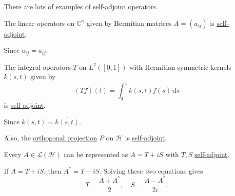 There are lots of examples of \hyperref[def:self-adjoint-op]{self-adjoint operators}.

\begin{eg}
	The linear operators on \(\mathbb{C} ^n\) given by Hermitian matrices \(A = (a_{ij} )\) is \hyperref[def:self-adjoint-op]{self-adjoint}.
\end{eg}
\begin{explanation}
	Since \(a_{ij} = \overline{a_{ij}}\).
\end{explanation}

\begin{eg}
	The integral operators \(T\) on \(L^2([0, 1])\) with Hermitian symmetric kernels \(k(s, t)\) given by
	\[
		(Tf)(t) = \int_{0}^{1} k(s, t)f(s) \,\mathrm{d}s
	\]
	is \hyperref[def:self-adjoint-op]{self-adjoint}.
\end{eg}
\begin{explanation}
	Since \(k(s, t) = \overline{k(s, t)}\).
\end{explanation}

Also, the \hyperref[def:orthogonal-projection]{orthogonal projection} \(P\) on \(\mathcal{H} \) is \hyperref[def:self-adjoint-op]{self-adjoint}.

\begin{remark}
	Every \(A\in \mathcal{L} (\mathcal{H} )\) can be represented as \(A = T+iS\) with \(T, S\) \hyperref[def:self-adjoint-op]{self-adjoint}.
\end{remark}
\begin{explanation}
	If \(A = T + iS\), then \(A^{\ast} = T - iS\). Solving these two equations gives
	\[
		T = \frac{A + A^{\ast} }{2},\quad S = \frac{A - A^{\ast} }{2i}.
	\]
\end{explanation}

